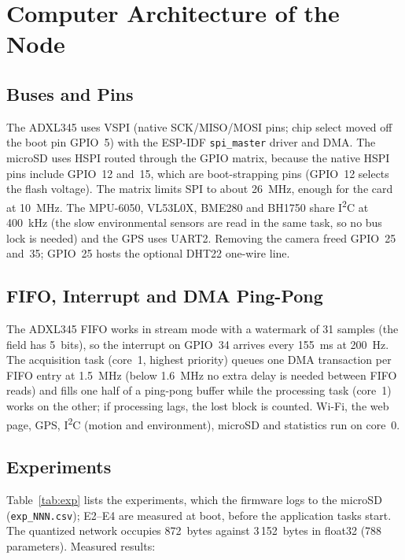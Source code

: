 \documentclass[journal,10pt]{IEEEtran}
\begin{document}
\section{Computer Architecture of the Node}
\subsection{Buses and Pins}
The ADXL345 uses VSPI (native SCK/MISO/MOSI pins; chip select moved off the boot pin GPIO~5) with the ESP-IDF \texttt{spi\_master} driver and DMA. The microSD uses HSPI routed through the GPIO matrix, because the native HSPI pins include GPIO~12 and~15, which are boot-strapping pins (GPIO~12 selects the flash voltage). The matrix limits SPI to about 26~MHz, enough for the card at 10~MHz. The MPU-6050, VL53L0X, BME280 and BH1750 share I\textsuperscript{2}C at 400~kHz (the slow environmental sensors are read in the same task, so no bus lock is needed) and the GPS uses UART2. Removing the camera freed GPIO~25 and~35; GPIO~25 hosts the optional DHT22 one-wire line.

\subsection{FIFO, Interrupt and DMA Ping-Pong}
The ADXL345 FIFO works in stream mode with a watermark of 31 samples (the field has 5~bits), so the interrupt on GPIO~34 arrives every 155~ms at 200~Hz. The acquisition task (core~1, highest priority) queues one DMA transaction per FIFO entry at 1.5~MHz (below 1.6~MHz no extra delay is needed between FIFO reads) and fills one half of a ping-pong buffer while the processing task (core~1) works on the other; if processing lags, the lost block is counted. Wi-Fi, the web page, GPS, I\textsuperscript{2}C (motion and environment), microSD and statistics run on core~0.

\subsection{Experiments}
Table~\ref{tab:exp} lists the experiments, which the firmware logs to the microSD (\texttt{exp\_NNN.csv}); E2--E4 are measured at boot, before the application tasks start. The quantized network occupies 872~bytes against 3\,152~bytes in float32 (788 parameters). Measured results:
\end{document}
